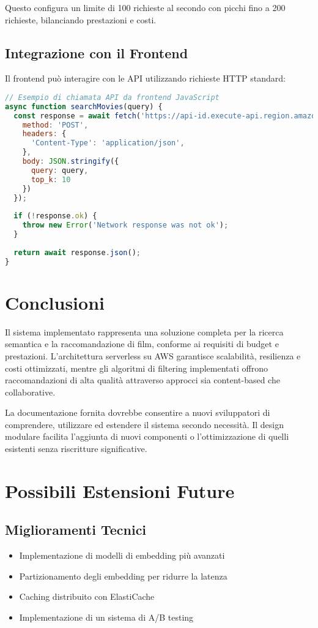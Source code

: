 \documentclass[11pt,a4paper]{article}
\begin{document}
Questo configura un limite di 100 richieste al secondo con picchi fino a 200 richieste, bilanciando prestazioni e costi.

\subsection{Integrazione con il Frontend}

Il frontend può interagire con le API utilizzando richieste HTTP standard:

\begin{lstlisting}[language=javascript]
// Esempio di chiamata API da frontend JavaScript
async function searchMovies(query) {
  const response = await fetch('https://api-id.execute-api.region.amazonaws.com/prod/search', {
    method: 'POST',
    headers: {
      'Content-Type': 'application/json',
    },
    body: JSON.stringify({
      query: query,
      top_k: 10
    })
  });
  
  if (!response.ok) {
    throw new Error('Network response was not ok');
  }
  
  return await response.json();
}
\end{lstlisting}

\section{Conclusioni}
Il sistema implementato rappresenta una soluzione completa per la ricerca semantica e la raccomandazione di film, conforme ai requisiti di budget e prestazioni. L'architettura serverless su AWS garantisce scalabilità, resilienza e costi ottimizzati, mentre gli algoritmi di filtering implementati offrono raccomandazioni di alta qualità attraverso approcci sia content-based che collaborative.

La documentazione fornita dovrebbe consentire a nuovi sviluppatori di comprendere, utilizzare ed estendere il sistema secondo necessità. Il design modulare facilita l'aggiunta di nuovi componenti o l'ottimizzazione di quelli esistenti senza riscritture significative.

\section{Possibili Estensioni Future}
\subsection{Miglioramenti Tecnici}
\begin{itemize}
  \item Implementazione di modelli di embedding più avanzati
  \item Partizionamento degli embedding per ridurre la latenza
  \item Caching distribuito con ElastiCache
  \item Implementazione di un sistema di A/B testing
\end{itemize}
\end{document}
